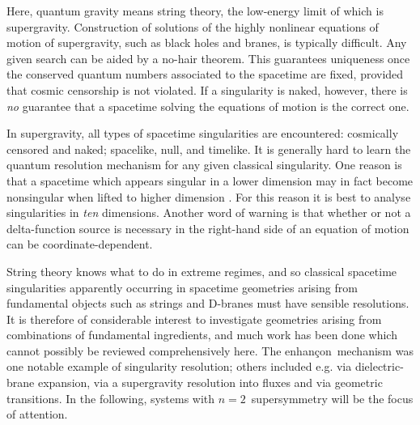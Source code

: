 \documentclass[a4paper,12pt]{amsproc}
\numberwithin{equation}{section}
\def\enh{enhan\c con}
\def\net{$n{=}2$}
\begin{document}
Here, quantum gravity means string theory, the low-energy limit of
which is supergravity.  Construction of solutions of the highly
nonlinear equations of motion of supergravity, such as black holes and
branes, is typically difficult.  Any given search can be aided by a
no-hair theorem.  This guarantees uniqueness once the conserved
quantum numbers associated to the spacetime are fixed, provided that
cosmic censorship is not violated.  If a singularity is naked,
however, there is {\em no} guarantee that a spacetime solving the
equations of motion is the correct one.

In supergravity, all types of spacetime singularities are encountered:
cosmically censored and naked; spacelike, null, and timelike.  It is
generally hard to learn the quantum resolution mechanism for any given
classical singularity.  One reason is that a spacetime which appears
singular in a lower dimension may in fact become nonsingular when
lifted to higher dimension \cite{ght}.  For this reason it is best to
analyse singularities in {\em ten} dimensions.
%
Another word of warning is that whether or not a delta-function source
is necessary in the right-hand side of an equation of motion can be
coordinate-dependent.  
%  

String theory knows what to do in extreme regimes, and so classical
spacetime singularities apparently occurring in spacetime geometries
arising from fundamental objects such as strings and D-branes must
have sensible resolutions.  It is therefore of considerable interest
to investigate geometries arising from combinations of fundamental
ingredients, and much work has been done which cannot possibly be
reviewed comprehensively here.  The \enh\ mechanism \cite{jpp} was one
notable example of singularity resolution; others included e.g.
\cite{polstr} via dielectric-brane expansion, \cite{klebstr} via a
supergravity resolution into fluxes and \cite{vaf} via geometric
transitions.  In the following, systems with \net\ supersymmetry will
be the focus of attention.
\end{document}
